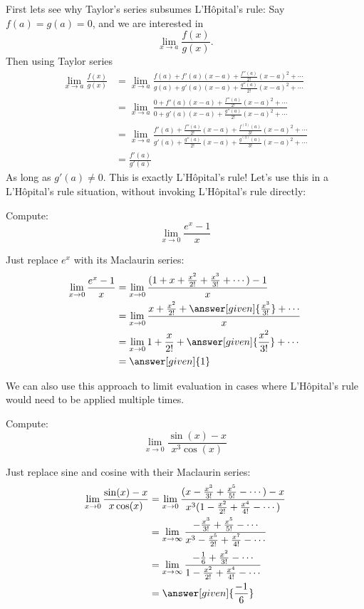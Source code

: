 \documentclass{ximera}
\begin{document}
First lets see why Taylor's series subsumes L'H\^{o}pital's rule: Say
$f(a) = g(a) = 0$, and we are interested in
\[
\lim_{x \to a}\frac{f(x)}{g(x)}.
\]
Then using Taylor series
\begin{align*}
	\lim_{x \to a} \frac{f(x)}{g(x)} &= \lim_{x \to a} \frac{f(a)+f'(a)(x-a)+\frac{f''(a)}{2!}(x-a)^2+\cdots}{g(a)+g'(a)(x-a)+\frac{g''(a)}{2!}(x-a)^2+\cdots}\\
		&=  \lim_{x \to a} \frac{0+f'(a)(x-a)+\frac{f''(a)}{2!}(x-a)^2+\cdots}{0+g'(a)(x-a)+\frac{g''(a)}{2!}(x-a)^2+\cdots}\\
		&=  \lim_{x \to a} \frac{f'(a)+\frac{f''(a)}{2!}(x-a)+\frac{f^{(3)}(a)}{3!}(x-a)^2+\cdots}{g'(a)+\frac{g''(a)}{2!}(x-a)+\frac{g^{(3)}(a)}{3!}(x-a)^2+\cdots}\\
		&=\frac{f'(a)}{g'(a)}
\end{align*}
As long as $g'(a) \neq 0$.  This is exactly L'H\^{o}pital's rule!
Let's use this in a L'H\^{o}pital's rule situation, without invoking
L'H\^{o}pital's rule directly:

\begin{example}
  Compute:
  \[
  \lim_{x \to 0} \frac{e^x - 1}{x}
  \]
  \begin{explanation}
    Just replace $e^x$ with its Maclaurin series:
    \begin{align*}
      \lim_{x \to 0} \frac{e^x - 1}{x} &= \lim_{x \to 0} \frac{(1+x+\frac{x^2}{2!}+\frac{x^3}{3!}+\cdots) - 1}{x}\\
      &= \lim_{x \to 0} \frac{x+\frac{x^2}{2!} +\answer[given]{\frac{x^3}{3!}}+\cdots}{x}\\
      &=\lim_{x \to 0} 1+\frac{x}{2!}+\answer[given]{\frac{x^2}{3!}}+\cdots\\
      &=\answer[given]{1}
    \end{align*}
  \end{explanation}
\end{example}

We can also use this approach to limit evaluation in cases where
L'H\^{o}pital's rule would need to be applied multiple times.

\begin{example}
  Compute:
  \[
  \lim_{x \to 0} \frac{\sin(x)-x}{x^3\cos(x)} 
  \]
  \begin{explanation}
    Just replace sine and cosine with their Maclaurin series:
    \begin{align*}
      \lim_{x \to 0} \frac{\sin(x)-x}{x\cos(x)} &= \lim_{x \to 0} \frac{(x-\frac{x^3}{3!}+\frac{x^5}{5!}-\cdots)-x}{x^3(1-\frac{x^2}{2!}+\frac{x^4}{4!}-\cdots)}\\
      &= \lim_{x \to \infty} \frac{-\frac{x^3}{3!}+\frac{x^5}{5!}-\cdots}{x^3 - \frac{x^5}{2!}+\frac{x^7}{4!}-\cdots}\\
      &=\lim_{x \to \infty} \frac{-\frac{1}{6}+\frac{x^2}{3!}-\cdots}{1-\frac{x^2}{2!}+\frac{x^4}{4!}-\cdots}\\
      &=\answer[given]{\frac{-1}{6}}
    \end{align*}
  \end{explanation}
\end{example}
\end{document}
